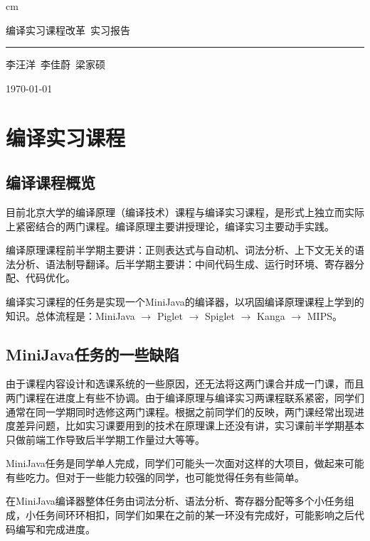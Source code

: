 \documentclass[a4paper]{ctexart}
\begin{document}
\begin{titlepage}
    \mbox{}
     cm
    \centering

    \Huge 编译实习课程改革\ 实习报告
    \rule{\textwidth}{1pt}\par %

    \huge 李汪洋\ 李佳蔚\ 梁家硕

    \Large \today

\end{titlepage}
\tableofcontents
\newpage

\section{编译实习课程}

\subsection{编译课程概览}

目前北京大学的编译原理（编译技术）课程与编译实习课程，是形式上独立而实际上紧密结合的两门课程。编译原理主要讲授理论，编译实习主要动手实践。

编译原理课程前半学期主要讲：正则表达式与自动机、词法分析、上下文无关的语法分析、语法制导翻译。后半学期主要讲：中间代码生成、运行时环境、寄存器分配、代码优化。

编译实习课程的任务是实现一个MiniJava的编译器，以巩固编译原理课程上学到的知识。总体流程是：MiniJava $\rightarrow$ Piglet $\rightarrow$ Spiglet $\rightarrow$ Kanga $\rightarrow$ MIPS。

\subsection{MiniJava任务的一些缺陷}

由于课程内容设计和选课系统的一些原因，还无法将这两门课合并成一门课，而且两门课程在进度上有些不协调。由于编译原理与编译实习两课程联系紧密，同学们通常在同一学期同时选修这两门课程。根据之前同学们的反映，两门课经常出现进度差异问题，比如实习课要用到的技术在原理课上还没有讲，实习课前半学期基本只做前端工作导致后半学期工作量过大等等。

MiniJava任务是同学单人完成，同学们可能头一次面对这样的大项目，做起来可能有些吃力。但对于一些能力较强的同学，也可能觉得任务有些简单。

在MiniJava编译器整体任务由词法分析、语法分析、寄存器分配等多个小任务组成，小任务间环环相扣，同学们如果在之前的某一环没有完成好，可能影响之后代码编写和完成进度。
\end{document}
